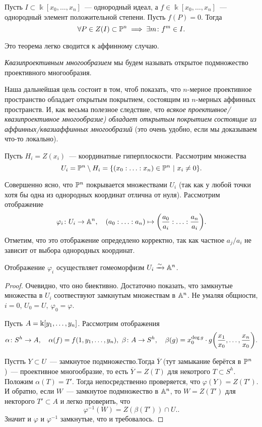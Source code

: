  	\begin{theorem} 
 		Пусть $I \subset \Bbbk[x_0, \ldots, x_n]$~--- однородный идеал, а $f \in \Bbbk[x_0, \ldots, x_n]$~--- однородный элемент положительной степени. Пусть $f(P) = 0$. Тогда 
 		\[
 			\forall P \in Z(I) \subset \PP^n \implies \exists m \colon f^m \in I.
 		\]
 	\end{theorem}

 	Это теорема легко сводится к аффинному случаю. 

 	\begin{definition} 
 		\emph{Квазипроективным многообразием} мы будем называть открытое подмножество проективного многообразия. 
 	\end{definition}

 	Наша дальнейшая цель состоит в том, чтоб показать, что $n$-мерное проективное пространство обладает открытым покрытием, состоящим из $n$-мерных аффинных пространств. И, как весьма полезное следствие, что \emph{всякое проективное/квазипроективное многообразие) обладает открытым покрытием состоящие из аффинных/квазиаффинных многообразий} (это очень удобно, если мы доказываем что-то локально).

 	Пусть $H_i = Z(x_i)$~--- координатные гиперплоскости. Рассмотрим множества 
 	\[
 		U_i = \PP^n \setminus H_i = \{ (x_0 : \ldots : x_n ) \in \PP^n \ \vert \ x_i \neq 0 \}. 
 	\]

 	Совершенно ясно, что $\PP^n$ покрывается множествами $U_i$ (так как у любой точки хотя бы одна из однородных координат отлична от нуля). Рассмотрим отображение 
 	\[
 		 \varphi_i\colon U_i \to \AA^n, \quad (a_0 : \ldots : a_n) \mapsto \lr*{\frac{a_0}{a_i} : \ldots : \frac{a_n}{a_i}}.
 	\]
 	Отметим, что это отображение опредедлено корректно, так как частное $a_j/a_i$ не зависит от выбора однородных координат. 

 	\begin{statement}\label{U_icongA^n} 
 		Отображение $\varphi_i$ осуществляет гомеоморфизм $U_i \xrightarrow{\sim} \AA^n$.
 	\end{statement}
 	\begin{proof}
 		Очевидно, что оно биективно. Достаточно показать, что замкнутые множества в $U_i$ соотвествуют замкнутым множествам в $\AA^n$. Не умаляя общности, $i = 0$, $U_0 = U, \ \varphi_0 = \varphi$.

 		Пусть $A = \bk[y_1, \ldots, y_n]$. Рассмотрим отображения 
 		\[
 			\alpha\colon S^h \to A, \quad \alpha(f) = f(1, y_1, \ldots, y_n), \ \beta \colon A \to S^h, \quad \beta(g) = x_0^{\deg{g}} \cdot g\lr*{\frac{x_1}{x_0}, \ldots, \frac{x_n}{x_0}}.
 		\]

 		Пустть $Y \subset U$~--- замкнутое подмножество.Тогда $\overline{Y}$ (тут замыкание берётся в $\PP^n$)~--- проективное многообразие, то есть $\overline{Y} = Z(T)$ для некотрого $T \subset S^h$. Положим $\alpha(T) = T'$. Тогда непосредственно проверяется, что $\varphi(Y) = Z(T')$. И обратно, если $W$~--- замкнутое подмножество в $\AA^n$, то $W = Z(T')$ для некторого $T' \subset A$ и легко проверить, что 
 		\[
 			\varphi^{-1}(W) = Z(\beta(T')) \cap U..
 		\]
 		Значит и $\varphi$ и $\varphi^{-1}$ замкнутые, что и требовалось. 
 	\end{proof}

